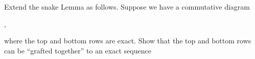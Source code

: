 \documentclass[11pt,fleqn]{book} %
\begin{document}
\begin{exr}
Extend the snake Lemma as follows. Suppose we have a commutative diagram
\begin{center}
,
\end{center}
where the top and bottom rows are exact. Show that the top and bottom rows can
be “grafted together” to an exact sequence
\begin{center}
\end{center}
\end{exr}
\end{document}
